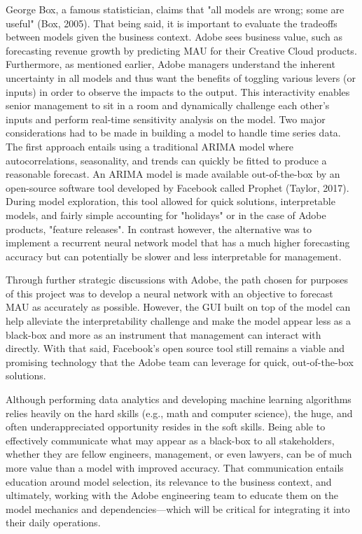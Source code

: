 \documentclass[11pt, oneside]{report}
\begin{document}
George Box, a famous statistician, claims that "all models are wrong; some are useful" (Box, 2005). That being said, it is important to evaluate the tradeoffs between models given the business context. Adobe sees business value, such as forecasting revenue growth by predicting MAU for their Creative Cloud products. Furthermore, as mentioned earlier, Adobe managers understand the inherent uncertainty in all models and thus want the benefits of toggling various levers (or inputs) in order to observe the impacts to the output. This interactivity enables senior management to sit in a room and dynamically challenge each other's inputs and perform real-time sensitivity analysis on the model.
Two major considerations had to be made in building a model to handle time series data. The first approach entails using a traditional ARIMA model where autocorrelations, seasonality, and trends can quickly be fitted to produce a reasonable forecast. An ARIMA model is made available out-of-the-box by an open-source software tool developed by Facebook called Prophet (Taylor, 2017).  During model exploration, this tool allowed for quick solutions, interpretable models, and fairly simple accounting for "holidays" or in the case of Adobe products, "feature releases".  In contrast however, the alternative was to implement a recurrent neural network model that has a much higher forecasting accuracy but can potentially be slower and less interpretable for management.

Through further strategic discussions with Adobe, the path chosen for purposes of this project was to develop a neural network with an objective to forecast MAU as accurately as possible. However, the GUI built on top of the model can help alleviate the interpretability challenge and make the model appear less as a black-box and more as an instrument that management can interact with directly. With that said, Facebook's open source tool still remains a viable and promising technology that the Adobe team can leverage for quick, out-of-the-box solutions.

Although performing data analytics and developing machine learning algorithms relies heavily on the hard skills (e.g., math and computer science), the huge, and often underappreciated opportunity resides in the soft skills. Being able to effectively communicate what may appear as a black-box to all stakeholders, whether they are fellow engineers, management, or even lawyers, can be of much more value than a model with improved accuracy. That communication entails education around model selection, its relevance to the business context, and ultimately, working with the Adobe engineering team to educate them on the model mechanics and dependencies---which will be critical for integrating it into their daily operations.
\end{document}
